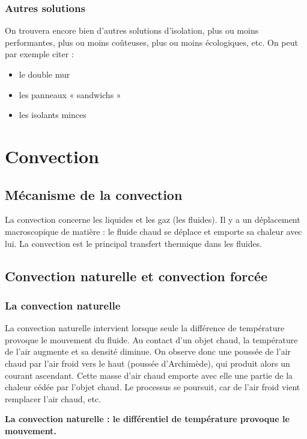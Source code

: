 \subsection*{Autres solutions}
On trouvera encore bien d'autres solutions d'isolation, plus ou moins performantes, plus ou moins coûteuses, plus ou moins écologiques, etc. On peut par exemple citer :
\begin{itemize}
  \item le double mur 
  \item les panneaux « sandwichs » 
  \item les isolants minces
\end{itemize}

\chapter{Convection}
\label{chap:convection}

\section{Mécanisme de la convection}

La convection concerne les liquides et les gaz (les fluides). Il y a un déplacement macroscopique de matière : le fluide chaud se déplace et emporte sa chaleur avec lui. La convection est le principal transfert thermique dans les fluides.

\section{Convection naturelle et convection forcée}

\subsection*{La convection naturelle}
La convection naturelle intervient lorsque seule la différence de température provoque le mouvement du fluide. Au contact d'un objet chaud, la température de l'air augmente et sa densité diminue. On observe donc une poussée de l'air chaud par l'air froid vers le haut (poussée d'Archimède), qui produit alors un courant ascendant.
Cette masse d'air chaud emporte avec elle une partie de la chaleur cédée par l'objet chaud.
Le processus se poursuit, car de l'air froid vient remplacer l'air chaud, etc.

\textbf{La convection naturelle : le différentiel de température provoque le mouvement.}

